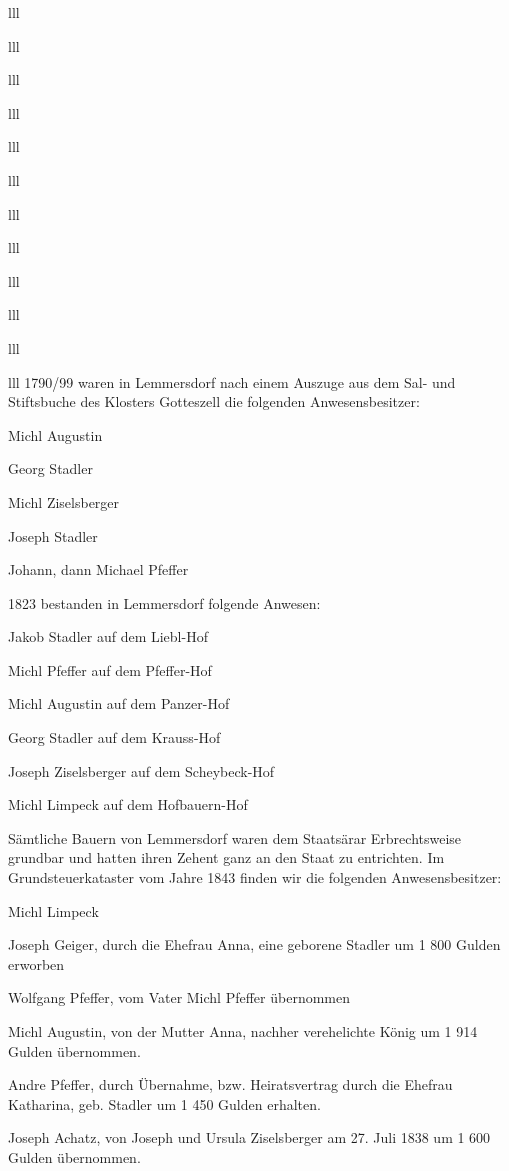 \documentclass[12pt,a4pager]{book}
\begin{document}
\begin{tabuluar}{lll}
\begin{tabuluar}{lll}
\begin{tabuluar}{lll}
\begin{tabuluar}{lll}
\begin{tabuluar}{lll}
\begin{tabuluar}{lll}
\begin{tabuluar}{lll}
\begin{tabuluar}{lll}
\begin{tabuluar}{lll}
\begin{tabuluar}{lll}
\begin{tabuluar}{lll}
\begin{tabuluar}{lll}
1790/99 waren in Lemmersdorf nach einem Auszuge aus dem Sal- und Stiftsbuche des
Klosters Gotteszell die folgenden Anwesensbesitzer:

\begin{compactitem}
\item Michl Augustin
\item Georg Stadler
\item Michl Ziselsberger
\item Joseph Stadler
\item Johann, dann Michael Pfeffer
\end{compactitem}

1823 bestanden in Lemmersdorf folgende Anwesen:

\begin{compactitem}
\item Jakob Stadler auf dem Liebl-Hof
\item Michl Pfeffer auf dem Pfeffer-Hof
\item Michl Augustin auf dem Panzer-Hof
\item Georg Stadler auf dem Krauss-Hof
\item Joseph Ziselsberger auf dem Scheybeck-Hof
\item Michl Limpeck auf dem Hofbauern-Hof
\end{compactitem}

Sämtliche Bauern von Lemmersdorf waren dem Staatsärar Erbrechtsweise grundbar
und hatten ihren Zehent ganz an den Staat zu entrichten. Im Grundsteuerkataster
vom Jahre 1843 finden wir die folgenden Anwesensbesitzer:

\begin{compactitem}
\item Michl Limpeck
\item Joseph Geiger, durch die Ehefrau Anna, eine geborene Stadler um 1 800
Gulden erworben
\item Wolfgang Pfeffer, vom Vater Michl Pfeffer übernommen
\item Michl Augustin, von der Mutter Anna, nachher verehelichte König um 1 914
Gulden übernommen.
\item Andre Pfeffer, durch Übernahme, bzw. Heiratsvertrag durch die Ehefrau
Katharina, geb. Stadler um 1 450 Gulden erhalten.
\item Joseph Achatz, von Joseph und Ursula Ziselsberger am 27. Juli 1838 um 1
600 Gulden übernommen.
\end{compactitem}


\end{tabuluar}
\end{tabuluar}
\end{tabuluar}
\end{tabuluar}
\end{tabuluar}
\end{tabuluar}
\end{tabuluar}
\end{tabuluar}
\end{tabuluar}
\end{tabuluar}
\end{tabuluar}
\end{tabuluar}
\end{document}
